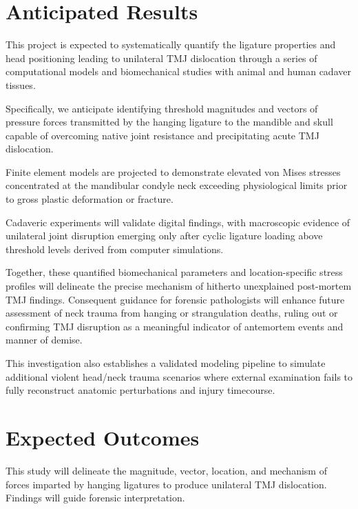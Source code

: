 \documentclass{article}
\begin{document}
%


\section{Anticipated Results}

This project is expected to systematically quantify the ligature properties and head positioning leading to unilateral TMJ dislocation through a series of computational models and biomechanical studies with animal and human cadaver tissues. 

Specifically, we anticipate identifying threshold magnitudes and vectors of pressure forces transmitted by the hanging ligature to the mandible and skull capable of overcoming native joint resistance and precipitating acute TMJ dislocation. 

Finite element models are projected to demonstrate elevated von Mises stresses concentrated at the mandibular condyle neck exceeding physiological limits prior to gross plastic deformation or fracture.

Cadaveric experiments will validate digital findings, with macroscopic evidence of unilateral joint disruption emerging only after cyclic ligature loading above threshold levels derived from computer simulations. 

Together, these quantified biomechanical parameters and location-specific stress profiles will delineate the precise mechanism of hitherto unexplained post-mortem TMJ findings. Consequent guidance for forensic pathologists will enhance future assessment of neck trauma from hanging or strangulation deaths, ruling out or confirming TMJ disruption as a meaningful indicator of antemortem events and manner of demise.

This investigation also establishes a validated modeling pipeline to simulate additional violent head/neck trauma scenarios where external examination fails to fully reconstruct anatomic perturbations and injury timecourse.

%
\section{Expected Outcomes}

This study will delineate the magnitude, vector, location, and mechanism of forces imparted by hanging ligatures to produce unilateral TMJ dislocation. Findings will guide forensic interpretation.

\end{document}
